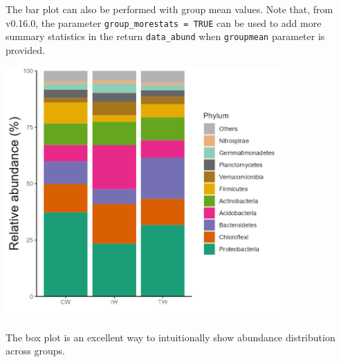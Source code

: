 \documentclass[
]{book}
\newenvironment{Shaded}{\begin{snugshade}}{\end{snugshade}}
\newcommand{\AttributeTok}[1]{\textcolor[rgb]{0.77,0.63,0.00}{#1}}
\newcommand{\CommentTok}[1]{\textcolor[rgb]{0.56,0.35,0.01}{\textit{#1}}}
\newcommand{\ConstantTok}[1]{\textcolor[rgb]{0.00,0.00,0.00}{#1}}
\newcommand{\DecValTok}[1]{\textcolor[rgb]{0.00,0.00,0.81}{#1}}
\newcommand{\FunctionTok}[1]{\textcolor[rgb]{0.00,0.00,0.00}{#1}}
\newcommand{\NormalTok}[1]{#1}
\newcommand{\OtherTok}[1]{\textcolor[rgb]{0.56,0.35,0.01}{#1}}
\newcommand{\SpecialCharTok}[1]{\textcolor[rgb]{0.00,0.00,0.00}{#1}}
\newcommand{\StringTok}[1]{\textcolor[rgb]{0.31,0.60,0.02}{#1}}
\begin{document}
The bar plot can also be performed with group mean values.
Note that, from v0.16.0, the parameter \texttt{group\_morestats\ =\ TRUE} can be used to add more summary statistics in the return \texttt{data\_abund} when \texttt{groupmean} parameter is provided.

\begin{Shaded}
\end{Shaded}

\begin{center}\includegraphics[width=400px]{Images/trans_abund_barplot_groupmean} \end{center}

The box plot is an excellent way to intuitionally show abundance distribution across groups.
\end{document}
